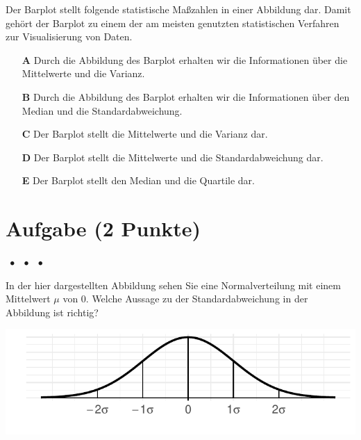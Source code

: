 \documentclass[a4paper, 9pt]{scrartcl}\usepackage[]{graphicx}\usepackage[]{xcolor}
\makeatletter
\def\maxwidth{ %
  \ifdim\Gin@nat@width>\linewidth
    \linewidth
  \else
    \Gin@nat@width
  \fi
}
\makeatother
\begin{document}
Der Barplot stellt folgende statistische Maßzahlen in einer Abbildung dar. Damit gehört der Barplot zu einem der am meisten genutzten statistischen Verfahren zur Visualisierung von Daten.

 



\begin{enumerate}
\item [\textbf{A} \msquare] Durch die Abbildung des Barplot erhalten wir die Informationen über die Mittelwerte und die Varianz.
\item [\textbf{B} \msquare] Durch die Abbildung des Barplot erhalten wir die Informationen über den Median und die Standardabweichung.
\item [\textbf{C} \msquare] Der Barplot stellt die Mittelwerte und die Varianz dar.
\item [\textbf{D} \msquare] Der Barplot stellt die Mittelwerte und die Standardabweichung dar.
\item [\textbf{E} \msquare] Der Barplot stellt den Median und die Quartile dar.
\end{enumerate} 

\section{Aufgabe \hfill (2 Punkte)}

\ifcollection
\begin{flushright}
\tiny\vspace{-2Ex}
\textbf{\examinhaltstart}
\exammodulestat $\;\bullet$
\exammodulestatbbv $\;\bullet$
\exammodulestatversuch $\;\bullet$
\exammodulebiostat
\vspace{-1Ex}
\end{flushright}
\fi




In der hier dargestellten Abbildung sehen Sie eine Normalverteilung mit einem Mittelwert $\mu$ von 0. Welche Aussage zu der Standardabweichung in der Abbildung ist richtig?



{\centering \includegraphics[width=\maxwidth]{img/mc-distribution-02-a-1} 

}
\end{document}

